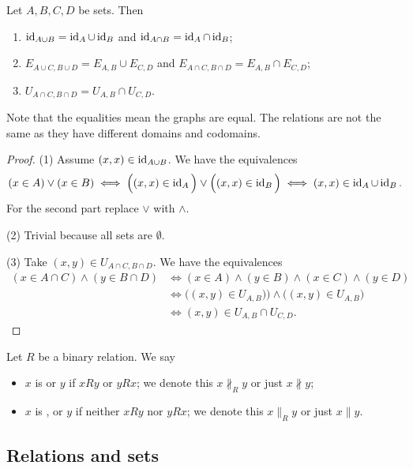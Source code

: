 \begin{lemma}
Let $A,B,C,D$ be sets. Then
\begin{enumerate}
\item $\operatorname{id}_{A\cup B} = \operatorname{id}_A\cup \operatorname{id}_B$ and $\operatorname{id}_{A\cap B} = \operatorname{id}_A\cap \operatorname{id}_B$;
\item $E_{A\cup C, B\cup D} = E_{A,B}\cup E_{C,D}$ and $E_{A\cap C, B\cap D} = E_{A,B}\cap E_{C,D}$;
\item $U_{A\cap C, B\cap D} = U_{A,B}\cap U_{C,D}$.
\end{enumerate}
\end{lemma}
Note that the equalities mean the graphs are equal. The relations are not the same as they have different domains and codomains.
\begin{proof}
(1) Assume $(x,x)\in \operatorname{id}_{A\cup B}$. We have the equivalences
\[ (x\in A)\lor (x\in B) \iff \Big((x,x)\in \operatorname{id}_A\Big) \lor \Big((x,x)\in\operatorname{id}_B\Big) \iff (x,x)\in \operatorname{id}_A\cup \operatorname{id}_B. \]
For the second part replace $\lor$ with $\land$.

(2) Trivial because all sets are $\emptyset$.

(3) Take $(x,y)\in U_{A\cap C, B\cap D}$. We have the equivalences
\begin{align*}
(x\in A\cap C) \land (y\in B\cap D) &\iff (x\in A)\land (y\in B)\land(x\in C)\land(y\in D) \\
&\iff \big((x,y)\in U_{A, B})\big)\land\big((x,y)\in U_{A, B}\big) \\
&\iff (x,y)\in U_{A,B}\cap U_{C,D}.
\end{align*}
\end{proof}


\begin{definition}
Let $R$ be a binary relation. We say
\begin{itemize}
\item $x$ is  or  $y$ if $xRy$ or $yRx$; we denote this $x\nparallel_R y$ or just $x\nparallel y$;
\item $x$ is ,  or  $y$ if neither $xRy$ nor $yRx$; we denote this $x\parallel_R y$ or just $x\parallel y$.
\end{itemize}
\end{definition}

\subsection{Relations and sets}
